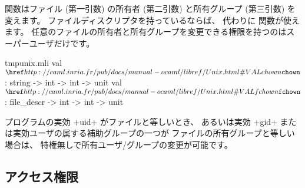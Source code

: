  関数はファイル (第一引数) の所有者 (第二引数) と所有グループ (第三引数) を変えます。
ファイルディスクリプタを持っているならば、 代わりに  関数が使えます。
任意のファイルの所有者と所有グループを変更できる権限を持つのはスーパーユーザだけです。
%
\begin{listingcodefile}{tmpunix.mli}
val $\libvalue{Unix}{chown}$ : string -> int -> int -> unit
val $\libvalue{Unix}{fchown}$ : file_descr -> int -> int -> unit
\end{listingcodefile}
プログラムの実効 \ml+uid+ がファイルと等しいとき、
あるいは実効 \ml+gid+ または実効ユーザの属する補助グループの一つが
ファイルの所有グループと等しい場合は、
特権無しで所有ユーザ/グループの変更が可能です。

\subsection*{アクセス権限}

